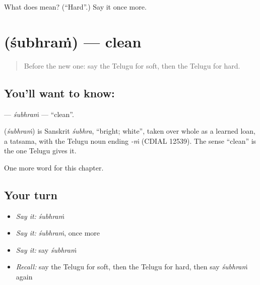 \begin{tcolorbox}[breakable,colback=teal!4,colframe=teal!35!black,title={Before you move on}]
What does  mean? (\textquotedblleft{}Hard\textquotedblright{}.) Say it once more.
\end{tcolorbox}
\section[\texorpdfstring{\te{శుభ్రం} (śubhraṁ)}{శుభ్రం (śubhraṁ)}]{ (śubhraṁ) — clean}

\label{lesson:TE-C137-subhram}



\begin{quote}
Before the new one: say the Telugu for soft, then the Telugu for hard.
\end{quote}

\subsection*{You'll want to know: }
\textbf{} — \emph{śubhraṁ} — \textquotedblleft{}clean\textquotedblright{}.

\begin{cousinweb}
\textbf{} (\emph{śubhraṁ}) is Sanskrit \emph{śubhra}, \textquotedblleft{}bright; white\textquotedblright{}, taken over whole as a learned loan, a tatsama, with the Telugu noun ending \emph{-ṁ} (CDIAL 12539). The sense \textquotedblleft{}clean\textquotedblright{} is the one Telugu gives it.
\end{cousinweb}

\begin{grammarlens}[title={What you've built}]
One more word for this chapter.
\end{grammarlens}

\subsection*{Your turn}
\begin{itemize}
\raggedright
  \item \emph{Say it:} \emph{śubhraṁ}
  \item \emph{Say it:} \emph{śubhraṁ}, once more
  \item \emph{Say it:} say \emph{śubhraṁ}
  \item \emph{Recall:} say the Telugu for soft, then the Telugu for hard, then say \emph{śubhraṁ} again
\end{itemize}

